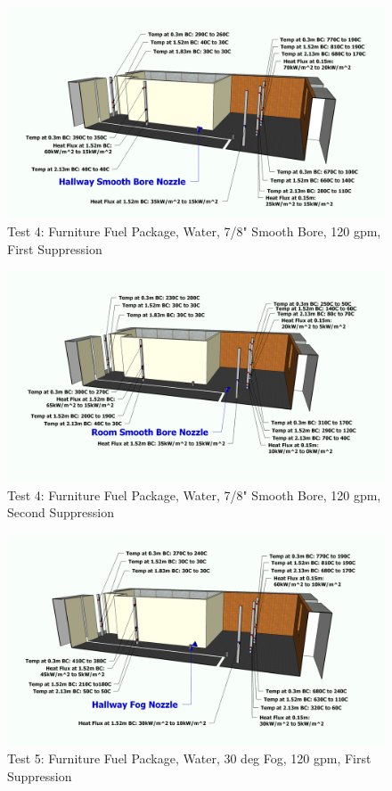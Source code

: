 \documentclass[12pt,oneside]{book}
\begin{document}
\begin{figure}[!ht]
	\includegraphics[width=6in]{../Figures/Pictures/Metric/DelCoSSTest4FirstSuppression}
	\caption{Test 4: Furniture Fuel Package, Water, 7/8" Smooth Bore, 120 gpm, First Suppression}
	\label{fig:Test_4_First_Suppression}
\end{figure}

\begin{figure}[!ht]
	\includegraphics[width=6in]{../Figures/Pictures/Metric/DelCoSSTest4SecondSuppression}
	\caption{Test 4: Furniture Fuel Package, Water, 7/8" Smooth Bore, 120 gpm, Second Suppression}
	\label{fig:Test_4_Second_Suppression}
\end{figure}

\begin{figure}[!ht]
	\includegraphics[width=6in]{../Figures/Pictures/Metric/DelCoFogTest5FirstSuppression}
	\caption{Test 5: Furniture Fuel Package, Water, 30 deg Fog, 120 gpm, First Suppression}
	\label{fig:Test_5_First_Suppression}
\end{figure}
\end{document}
